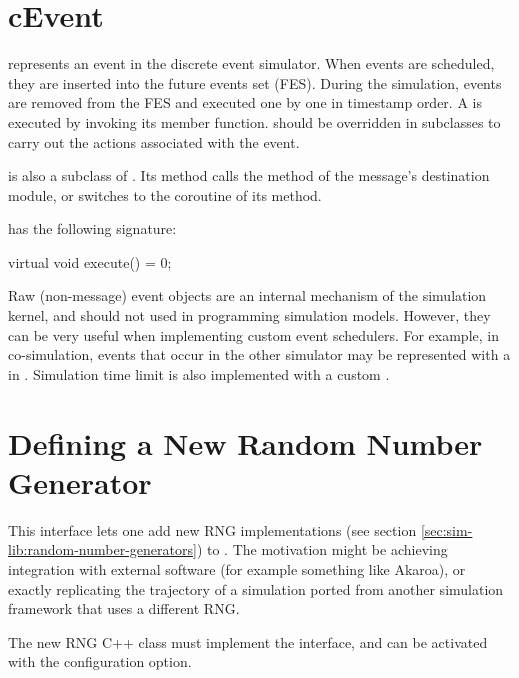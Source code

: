 \section{cEvent}
\label{sec:plugin-exts:cevent}

 represents an event in the discrete event simulator. When
events are scheduled, they are inserted into the future events set (FES).
During the simulation, events are removed from the FES and executed one by
one in timestamp order. A  is executed by invoking its
 member function.  should be overridden
in subclasses to carry out the actions associated with the event.

\begin{note}
 is also a subclass of . Its
 method calls the  method of the
message's destination module, or switches to the coroutine of its
 method.
\end{note}

 has the following signature:

\begin{cpp}
virtual void execute() = 0;
\end{cpp}

Raw (non-message) event objects are an internal mechanism of the {\opp}
simulation kernel, and should not used in programming simulation models.
However, they can be very useful when implementing custom event schedulers.
For example, in co-simulation, events that occur in the other simulator may
be represented with a  in {\opp}. Simulation time limit
is also implemented with a custom .


\section{Defining a New Random Number Generator}
\label{sec:plugin-exts:rng}

This interface lets one add new RNG implementations (see section
\ref{sec:sim-lib:random-number-generators}) to {\opp}.
The motivation might be achieving integration with external software (for
example something like Akaroa), or exactly replicating the trajectory of a
simulation ported from another simulation framework that uses a different
RNG.

The new RNG C++ class must implement the  interface,
and can be activated with the  configuration option.



